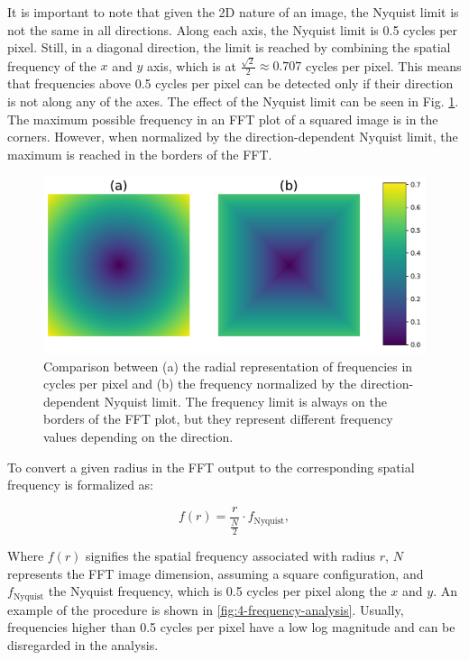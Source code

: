         It is important to note that given the 2D nature of an image, the Nyquist limit is not the same in all directions. 
        Along each axis, the Nyquist limit is 0.5 cycles per pixel. Still, in a diagonal direction, the limit is reached by combining the spatial frequency of the $x$ and $y$ axis, which is at $\frac{\sqrt{2}}{2} \approx 0.707$ cycles per pixel. 
        This means that frequencies above 0.5 cycles per pixel can be detected only if their direction is not along any of the axes.
        The effect of the Nyquist limit can be seen in Fig. \ref{fig:5-square_vs_radial}. The maximum possible frequency in an FFT plot of a squared image is in the corners. However, when normalized by the direction-dependent Nyquist limit, the maximum is reached in the borders of the FFT.

        \begin{figure}[H]
            \centering
            \includegraphics[width=\linewidth]{Includes/5-square_vs_radial.pdf}
            \caption{Comparison between (a) the radial representation of frequencies in cycles per pixel and (b) the frequency normalized by the direction-dependent Nyquist limit. The frequency limit is always on the borders of the FFT plot, but they represent different frequency values depending on the direction.
            }
            \label{fig:5-square_vs_radial}
        \end{figure}
        
        
        To convert a given radius in the FFT output to the corresponding spatial frequency is formalized as:

        \begin{equation}
            f(r) = \frac{r}{\frac{N}{2}} \cdot f_{\text{Nyquist}},
        \end{equation}

        Where \( f(r) \) signifies the spatial frequency associated with radius \( r \), \( N \) represents the FFT image dimension, assuming a square configuration, and \( f_{\text{Nyquist}} \) the Nyquist frequency, which is 0.5 cycles per pixel along the $x$ and $y$. An example of the procedure is shown in \ref{fig:4-frequency-analysis}. Usually, frequencies higher than 0.5 cycles per pixel have a low log magnitude and can be disregarded in the analysis.


